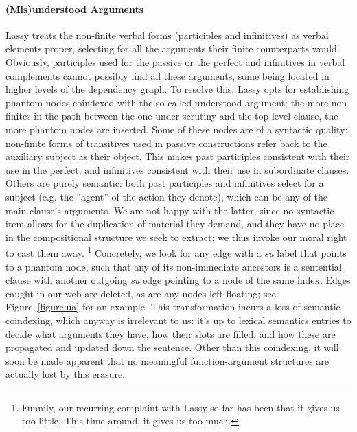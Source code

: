 \paragraph{(Mis)understood Arguments}
Lassy treats the non-finite verbal forms (participles and infinitives) as verbal elements proper, selecting for all the arguments their finite counterparts would.
Obviously, participles used for the passive or the perfect and infinitives in verbal complements cannot possibly find all these arguments, some being located in higher levels of the dependency graph.
To resolve this, Lassy opts for establishing phantom nodes coindexed with the so-called understood argument; the more non-finites in the path between the one under scrutiny and the top level clause, the more phantom nodes are inserted.
Some of these nodes are of a syntactic quality:  non-finite forms of transitives used in passive constructions refer back to the auxiliary subject as their object.
This makes past participles consistent with their use in the perfect, and infinitives consistent with their use in subordinate clauses.
Others are purely semantic: both past participles and infinitives select for a subject (e.g. the ``agent'' of the action they denote), which can be any of the main clause's arguments.
We are not happy with the latter, since no syntactic item allows for the duplication of material they demand, and they have no place in the compositional structure we seek to extract; we thus invoke our moral right to cast them away.%
	\footnote{Funnily, our recurring complaint with Lassy so far has been that it gives us too little. 
	This time around, it gives us too much.}
Concretely, we look for any edge with a \textit{su} label that points to a phantom node, such that any of its non-immediate ancestors is a sentential clause with another outgoing \textit{su} edge pointing to a node of the same index.
Edges caught in our web are deleted, as are any nodes left floating; see Figure~\ref{figure:ua} for an example.
This transformation incurs a loss of semantic coindexing, which anyway is irrelevant to us: it's up to lexical semantics entries to decide what arguments they have, how their slots are filled, and how these are propagated and updated down the sentence.
Other than this coindexing, it will soon be made apparent that no meaningful function-argument structures are actually lost by this erasure.



